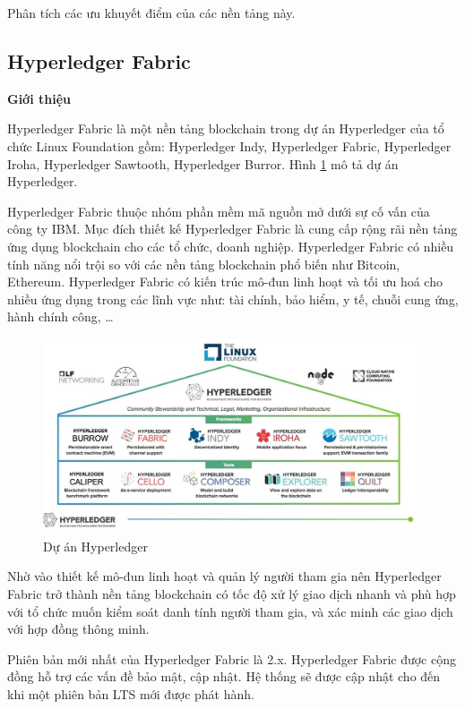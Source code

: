 Phân tích các ưu khuyết điểm của các nền tảng này.

\subsection{Hyperledger Fabric}

\textbf{Giới thiệu}

Hyperledger Fabric là một nền tảng blockchain trong dự án Hyperledger của tổ chức Linux Foundation gồm: Hyperledger Indy, Hyperledger Fabric, Hyperledger Iroha, Hyperledger Sawtooth, Hyperledger Burror. Hình \ref{fig:hlf_um} mô tả dự án Hyperledger.

Hyperledger Fabric thuộc nhóm phần mềm mã nguồn mở dưới sự cố vấn của công ty IBM. Mục đích thiết kế Hyperledger Fabric là cung cấp rộng rãi nền tảng ứng dụng blockchain cho các tổ chức, doanh nghiệp. Hyperledger Fabric có nhiều tính năng nổi trội so với các nền tảng blockchain phổ biến như Bitcoin, Ethereum. Hyperledger Fabric có kiến trúc mô-đun linh hoạt và tối ưu hoá cho nhiều ứng dụng trong các lĩnh vực như: tài chính, bảo hiểm, y tế, chuỗi cung ứng, hành chính công, \ldots{}

\begin{figure}[htbp]
\centering
\includegraphics[width=.9\linewidth]{img/hlf_um.jpg}
\caption{Dự án Hyperledger}
\label{fig:hlf_um}
\end{figure}

Nhờ vào thiết kế mô-đun linh hoạt và quản lý người tham gia nên Hyperledger Fabric trở thành nền tảng blockchain có tốc độ xử lý giao dịch nhanh và phù hợp với tổ chức muốn kiểm soát danh tính người tham gia, và xác minh các giao dịch với hợp đồng thông minh.

Phiên bản mới nhất của Hyperledger Fabric là 2.x. Hyperledger Fabric được cộng đồng hỗ trợ các vấn đề bảo mật, cập nhật. Hệ thống sẽ được cập nhật cho đến khi một phiên bản LTS mới được phát hành.



